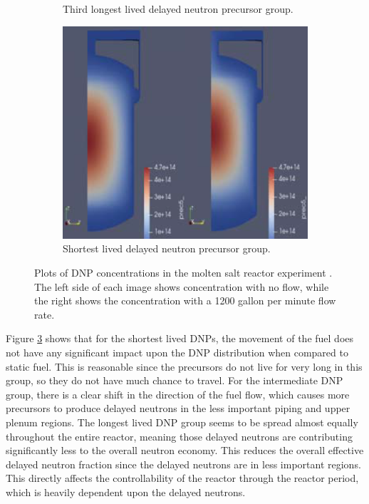 \begin{figure}[H]
\begin{subfigure}{0.4\textwidth}
    \caption{Third longest lived delayed neutron precursor group.}
    \label{fig:second}
\end{subfigure}
\hfill
\centering
\begin{subfigure}{0.4\textwidth}
    \includegraphics[scale=0.25]{images/dnp6.PNG}
    \caption{Shortest lived delayed neutron precursor group.}
    \label{fig:third}
\end{subfigure}
        
\caption{Plots of DNP concentrations in the molten salt reactor experiment \cite{shi_gen-foam_2021}. The left side of each image shows concentration with no flow, while the right shows the concentration with a 1200 gallon per minute flow rate.}
\label{fig:genfoam_dnp_locations}
\end{figure}



Figure \ref{fig:genfoam_dnp_locations} shows that for the shortest lived DNPs, the movement of the fuel does not have any significant impact upon the DNP distribution when compared to static fuel. This is reasonable since the precursors do not live for very long in this group, so they do not have much chance to travel. For the intermediate DNP group, there is a clear shift in the direction of the fuel flow, which causes more precursors to produce delayed neutrons in the less important piping  and upper plenum regions. The longest lived DNP group seems to be spread almost equally throughout the entire reactor, meaning those delayed neutrons are contributing significantly less to the overall neutron economy. This reduces the overall effective delayed neutron fraction since the delayed neutrons are in less important regions. This directly affects the controllability of the reactor through the reactor period, which is heavily dependent upon the delayed neutrons.

